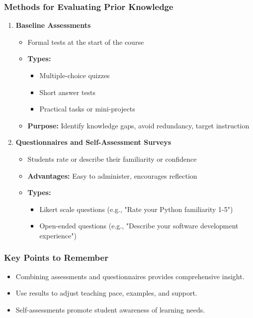 \documentclass{beamer}
\begin{document}
\begin{frame}[fragile]
    \frametitle{Methods for Evaluating Prior Knowledge}
    
    \begin{enumerate}
        \item \textbf{Baseline Assessments}
        \begin{itemize}
            \item Formal tests at the start of the course
            \item \textbf{Types:}
            \begin{itemize}
                \item Multiple-choice quizzes
                \item Short answer tests
                \item Practical tasks or mini-projects
            \end{itemize}
            \item \textbf{Purpose:} Identify knowledge gaps, avoid redundancy, target instruction
        \end{itemize}
        \item \textbf{Questionnaires and Self-Assessment Surveys}
        \begin{itemize}
            \item Students rate or describe their familiarity or confidence
            \item \textbf{Advantages:} Easy to administer, encourages reflection
            \item \textbf{Types:}
            \begin{itemize}
                \item Likert scale questions (e.g., "Rate your Python familiarity 1-5")
                \item Open-ended questions (e.g., "Describe your software development experience")
            \end{itemize}
        \end{itemize}
    \end{enumerate}
\end{frame}

\begin{frame}[fragile]
    \frametitle{Key Points to Remember}
    \begin{itemize}
        \item Combining assessments and questionnaires provides comprehensive insight.
        \item Use results to adjust teaching pace, examples, and support.
        \item Self-assessments promote student awareness of learning needs.
    \end{itemize}
\end{frame}
\end{document}
